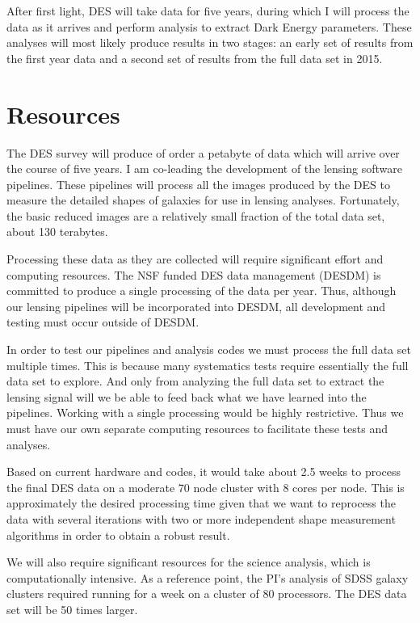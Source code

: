 \documentclass[12pt]{article}
\begin{document}
After first light, DES will take data for five years, during which I will
process the data as it arrives and perform analysis to extract Dark Energy
parameters.  These analyses will most likely produce results in two stages: an
early set of results from the first year data and a second set of results from
the full data set in 2015.  

\section{Resources}

The DES survey will produce of order a petabyte of data which will arrive over
the course of five years.  I am co-leading the development of the lensing
software pipelines.  These pipelines will process all the images produced by
the DES to measure the detailed shapes of galaxies for use in lensing analyses.
Fortunately, the basic reduced images are a relatively small fraction of the
total data set, about 130 terabytes.

Processing these data as they are collected will require significant effort and
computing resources.  The NSF funded DES data management (DESDM) is committed
to produce a single processing of the data per year.  Thus, although our
lensing pipelines will be incorporated into DESDM, all development and testing
must occur outside of DESDM.  

In order to test our pipelines and analysis codes we must process the full data
set multiple times.  This is because many systematics tests require essentially
the full data set to explore.  And only from analyzing the full data set to
extract the lensing signal will we be able to feed back what we have learned
into the pipelines.  Working with a single processing would be highly
restrictive.  Thus we must have our own separate computing resources to
facilitate these tests and analyses.  

Based on current hardware and codes, it would take about 2.5 weeks to process
the final DES data on a moderate 70 node cluster with 8 cores per node.  This
is approximately the desired processing time given that we want to reprocess
the data with several iterations with two or more independent shape measurement
algorithms in order to obtain a robust result.


We will also require significant resources for the science analysis, which is
computationally intensive.  As a reference point, the PI's analysis of SDSS
galaxy clusters required running for a week on a cluster of 80 processors.
The DES data set will be 50 times larger.
\end{document}
